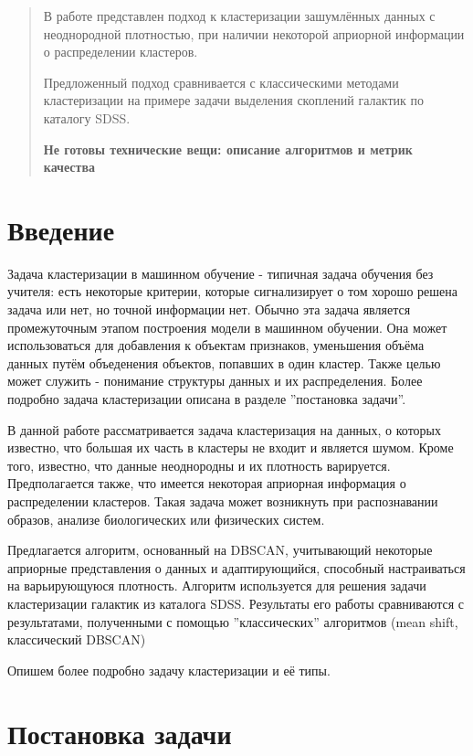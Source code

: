 \documentclass[12pt,fleqn]{article}
\begin{document}
\newpage
\renewcommand{\contentsname}{Содержание}
\tableofcontents

\newpage
\begin{abstract}
    В работе представлен подход к кластеризации зашумлённых данных с неоднородной плотностью, при наличии некоторой априорной информации о распределении кластеров.
    
   Предложенный подход сравнивается с классическими методами кластеризации на примере задачи выделения скоплений галактик по каталогу SDSS.
    
    \textbf{Не готовы технические вещи: описание алгоритмов и метрик качества }
    
\end{abstract}

\newpage
\section{Введение}
Задача кластеризации в машинном обучение - типичная задача обучения без учителя: есть некоторые критерии, которые сигнализирует о том хорошо решена задача или нет, но точной информации нет. Обычно эта задача является промежуточным этапом построения модели в машинном обучении. Она может использоваться для добавления к объектам признаков, уменьшения объёма данных путём объеденения объектов, попавших в один кластер. Также целью может служить - понимание структуры данных и их распределения. Более подробно задача кластеризации описана в разделе ''постановка задачи''.

В данной работе рассматривается задача кластеризация на данных, о которых известно, что большая их часть в кластеры не входит и является шумом. Кроме того, известно, что данные неоднородны и их плотность варируется. Предполагается также, что имеется некоторая априорная информация о распределении кластеров. Такая задача может возникнуть при распознавании образов, анализе биологических или физических систем.

Предлагается алгоритм, основанный на DBSCAN, учитывающий некоторые априорные представления о данных и адаптирующийся, способный настраиваться на варьирующуюся плотность. Алгоритм используется для решения задачи кластеризации галактик из каталога SDSS. Результаты его работы сравниваются с результатами, полученными с помощью ''классических'' алгоритмов (mean shift, классический DBSCAN)

Опишем более подробно задачу кластеризации и её типы.

\section{Постановка задачи}\label{problem}
\end{document}
